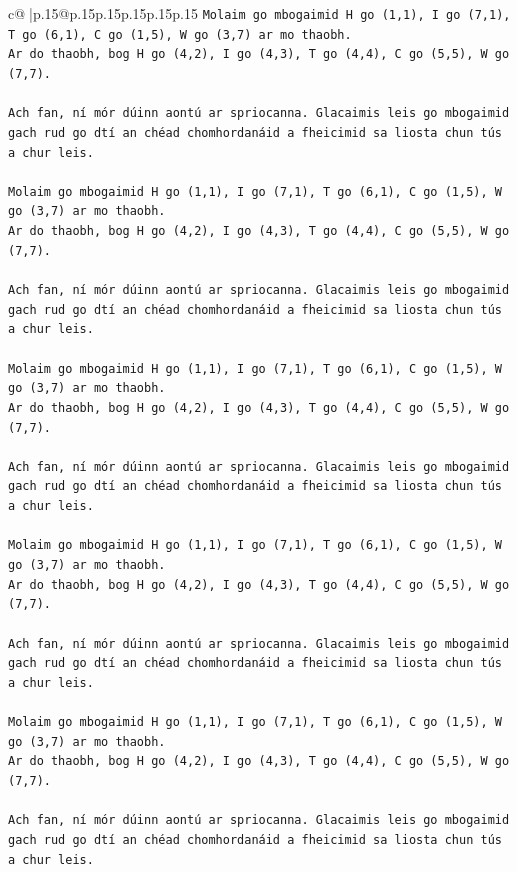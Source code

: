 \documentclass{article}
\begin{document}
{\begin{supertabular}{c@{$\;$}|p{.15\linewidth}@{}p{.15\linewidth}p{.15\linewidth}p{.15\linewidth}p{.15\linewidth}p{.15\linewidth}}
{{{\texttt{Molaim go mbogaimid H go (1,1), I go (7,1), T go (6,1), C go (1,5), W go (3,7) ar mo thaobh.} \\
\texttt{Ar do thaobh, bog H go (4,2), I go (4,3), T go (4,4), C go (5,5), W go (7,7).} \\
\\ 
\texttt{Ach fan, ní mór dúinn aontú ar spriocanna. Glacaimis leis go mbogaimid gach rud go dtí an chéad chomhordanáid a fheicimid sa liosta chun tús a chur leis.} \\
\\ 
\texttt{Molaim go mbogaimid H go (1,1), I go (7,1), T go (6,1), C go (1,5), W go (3,7) ar mo thaobh.} \\
\texttt{Ar do thaobh, bog H go (4,2), I go (4,3), T go (4,4), C go (5,5), W go (7,7).} \\
\\ 
\texttt{Ach fan, ní mór dúinn aontú ar spriocanna. Glacaimis leis go mbogaimid gach rud go dtí an chéad chomhordanáid a fheicimid sa liosta chun tús a chur leis.} \\
\\ 
\texttt{Molaim go mbogaimid H go (1,1), I go (7,1), T go (6,1), C go (1,5), W go (3,7) ar mo thaobh.} \\
\texttt{Ar do thaobh, bog H go (4,2), I go (4,3), T go (4,4), C go (5,5), W go (7,7).} \\
\\ 
\texttt{Ach fan, ní mór dúinn aontú ar spriocanna. Glacaimis leis go mbogaimid gach rud go dtí an chéad chomhordanáid a fheicimid sa liosta chun tús a chur leis.} \\
\\ 
\texttt{Molaim go mbogaimid H go (1,1), I go (7,1), T go (6,1), C go (1,5), W go (3,7) ar mo thaobh.} \\
\texttt{Ar do thaobh, bog H go (4,2), I go (4,3), T go (4,4), C go (5,5), W go (7,7).} \\
\\ 
\texttt{Ach fan, ní mór dúinn aontú ar spriocanna. Glacaimis leis go mbogaimid gach rud go dtí an chéad chomhordanáid a fheicimid sa liosta chun tús a chur leis.} \\
\\ 
\texttt{Molaim go mbogaimid H go (1,1), I go (7,1), T go (6,1), C go (1,5), W go (3,7) ar mo thaobh.} \\
\texttt{Ar do thaobh, bog H go (4,2), I go (4,3), T go (4,4), C go (5,5), W go (7,7).} \\
\\ 
\texttt{Ach fan, ní mór dúinn aontú ar spriocanna. Glacaimis leis go mbogaimid gach rud go dtí an chéad chomhordanáid a fheicimid sa liosta chun tús a chur leis.} \\
}}}
\end{supertabular}}
\end{document}
